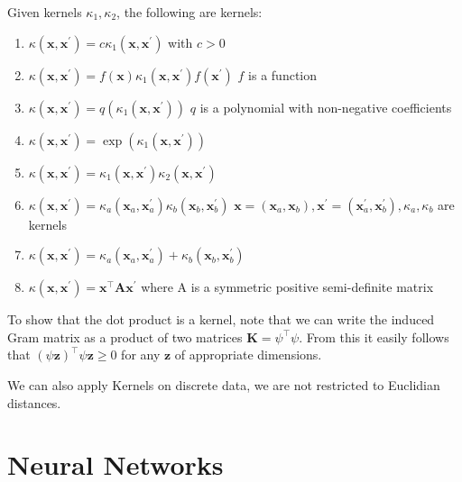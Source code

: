 \documentclass[11pt, %
	oneside, %
	english, %
	onehalfspacing, %
	parskip, %
	]{article} %
\theoremstyle{definition}
\begin{document}
Given kernels $\kappa_1, \kappa_2$, the following are kernels:
\begin{enumerate}
	\item $\kappa\left(\mathbf{x}, \mathbf{x}^{\prime}\right)=c \kappa_1\left(\mathbf{x}, \mathbf{x}^{\prime}\right)$ with $c > 0$
	\item $\kappa\left(\mathbf{x}, \mathbf{x}^{\prime}\right)=f(\mathbf{x}) \kappa_1\left(\mathbf{x}, \mathbf{x}^{\prime}\right) f\left(\mathbf{x}^{\prime}\right)$ $f$ is a function
	\item $\kappa\left(\mathbf{x}, \mathbf{x}^{\prime}\right)=q\left(\kappa_1\left(\mathbf{x}, \mathbf{x}^{\prime}\right)\right)$
$q$ is a polynomial with non-negative coefficients
	\item $\kappa\left(\mathbf{x}, \mathbf{x}^{\prime}\right)=\exp \left(\kappa_1\left(\mathbf{x}, \mathbf{x}^{\prime}\right)\right)$
	\item $\kappa\left(\mathbf{x}, \mathbf{x}^{\prime}\right)=\kappa_1\left(\mathbf{x}, \mathbf{x}^{\prime}\right) \kappa_2\left(\mathbf{x}, \mathbf{x}^{\prime}\right)$
	\item $\kappa\left(\mathbf{x}, \mathbf{x}^{\prime}\right)=\kappa_a\left(\mathbf{x}_a, \mathbf{x}_a^{\prime}\right) \kappa_b\left(\mathbf{x}_b, \mathbf{x}_b^{\prime}\right)$
$\mathbf{x}=\left(\mathbf{x}_a, \mathbf{x}_b\right), \mathbf{x}^{\prime}=\left(\mathbf{x}_a^{\prime}, \mathbf{x}_b^{\prime}\right), \kappa_a, \kappa_b$ are kernels
\item $\kappa\left(\mathbf{x}, \mathbf{x}^{\prime}\right)=\kappa_a\left(\mathbf{x}_a, \mathbf{x}_a^{\prime}\right)+\kappa_b\left(\mathbf{x}_b, \mathbf{x}_b^{\prime}\right)$
	\item $\kappa\left(\mathbf{x}, \mathbf{x}^{\prime}\right)=\mathbf{x}^{\top} \mathbf{A} \mathbf{x}^{\prime}$
	where A is a symmetric positive semi-definite matrix
\end{enumerate}

To show that the dot product is a kernel, note that we can write the induced Gram matrix as a product of two matrices $\mathbf{K} = \psi^\top \psi$. From this it easily follows that $(\psi \mathbf{z})^\top \psi \mathbf{z} \geq 0$ for any $\mathbf{z}$ of appropriate dimensions.

We can also apply Kernels on discrete data, we are not restricted to Euclidian distances.


\section{Neural Networks}
\end{document}
